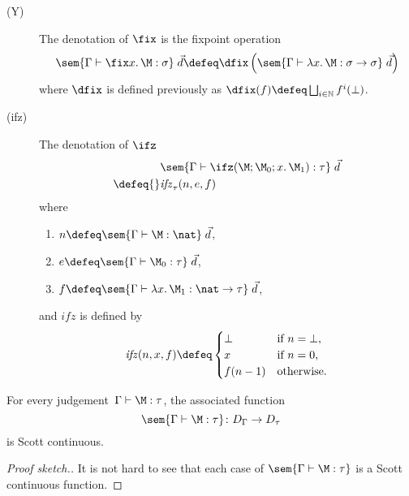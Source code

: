 \begin{frame}
  \begin{description}
    \item[(Y)] The denotation of $\fix$ is the fixpoint operation 
      \[
        \sem{\Gamma \vdash \fix x.\, \M : \sigma}\;\vec{d} \defeq
        \dfix
        \left(
          \sem{\Gamma \vdash \lambda x.\, \M : \sigma \to \sigma}\;\vec{d}
        \right)
      \]
      where $\dfix$ is defined previously as $\dfix(f) \defeq \bigsqcup_{i \in
        \mathbb{N}} f^i(\bot)$.
    \item[(ifz)] The denotation of $\ifz$ 
      \begin{align*}
        & \sem{\Gamma \vdash \ifz(\M; \M_0; x.\,\M_1) : \tau}\;\vec{d} \\
        \defeq{} & \mathit{ifz}_\tau (n , e, f)
      \end{align*}
      where
      \begin{enumerate}
        \item $n \defeq \sem{\Gamma \vdash \M  : \nat}\;\vec{d}$, 
        \item $e \defeq \sem{\Gamma \vdash \M_0 : \tau}\;\vec{d}$, 
        \item $f \defeq \sem{\Gamma \vdash \lambda x.\, \M_1 : \nat\to\tau}\; \vec{d}$,
      \end{enumerate} and $\mathit{ifz}$ is defined by
          \[
            \mathit{ifz}(n, x, f) \defeq
            \begin{cases}
              \bot & \text{if $n = \bot$,} \\
              x   & \text{if $n = 0$,} \\
              f(n-1) & \text{otherwise.} \\
            \end{cases}
          \]
      \end{description}
\end{frame}

\begin{frame}
  \begin{theorem}
    For every judgement~$\Gamma \vdash \M:\tau$, 
    the associated function
    \[
      \sem{\Gamma \vdash \M : \tau} \colon D_\Gamma \to D_{\tau}
    \]
    is Scott continuous. 
  \end{theorem}
  \begin{proof}[Proof sketch.]
    It is not hard to see that each case of $\sem{\Gamma \vdash \M : \tau}$
    is a Scott continuous function.
  \end{proof}
\end{frame}

